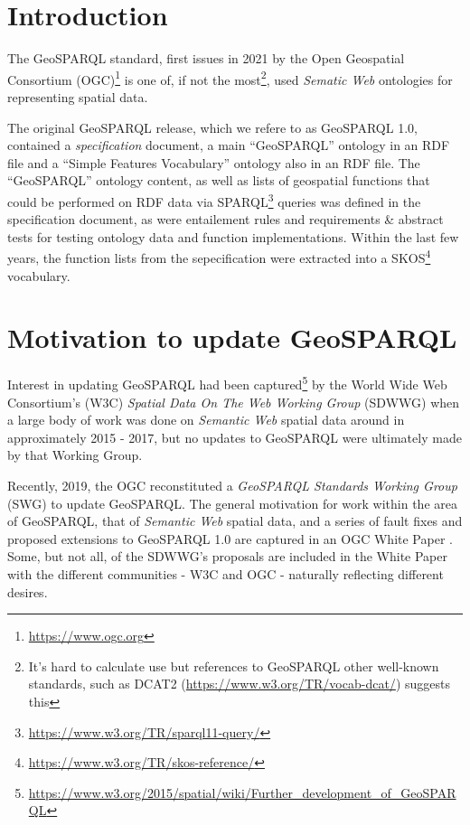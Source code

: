 \documentclass[runningheads]{llncs}
\begin{document}
\section{Introduction}\label{sec:introduction}
The GeoSPARQL standard, first issues in 2021 by the Open Geospatial Consortium (OGC)\footnote{\url{https://www.ogc.org}} 
is one of, if not the most\footnote{It's hard to calculate use but references to GeoSPARQL other well-known standards, 
such as DCAT2 (\url{https://www.w3.org/TR/vocab-dcat/}) suggests this}, used \textit{Sematic Web} ontologies for 
representing spatial data.

The original GeoSPARQL release, which we refere to as GeoSPARQL 1.0, contained a \textit{specification} document,
a main ``GeoSPARQL'' ontology in an RDF file and a ``Simple Features Vocabulary'' ontology also in an RDF file. The 
``GeoSPARQL'' ontology content, as well as lists of geospatial functions that could be performed on RDF data via 
SPARQL\footnote{\url{https://www.w3.org/TR/sparql11-query/}} queries was defined in the specification document, as
were entailement rules and requirements \& abstract tests for testing ontology data and function implementations. 
Within the last few years, the function lists from the sepecification were extracted into a SKOS\footnote{\url{https://www.w3.org/TR/skos-reference/}}
vocabulary.


\section{Motivation to update GeoSPARQL}\label{sec:motivation}
Interest in updating GeoSPARQL had been captured\footnote{\url{https://www.w3.org/2015/spatial/wiki/Further_development_of_GeoSPARQL}}
 by the World Wide Web Consortium's (W3C) \textit{Spatial Data On The Web Working Group} (SDWWG)
when a large body of work was done on \textit{Semantic Web} spatial data around in approximately 2015 - 2017, but 
no updates to GeoSPARQL were ultimately made by that Working Group.


Recently, 2019, the OGC reconstituted a \textit{GeoSPARQL Standards Working Group} (SWG) to update GeoSPARQL. The general 
motivation for work within the area of GeoSPARQL, that of \textit{Semantic Web} spatial data, and a series of
fault fixes and proposed extensions to GeoSPARQL 1.0 are captured in an OGC White Paper \cite{geosparqlwhitepaper}. Some,
but not all, of the SDWWG's proposals are included in the White Paper with the different communities - W3C and OGC - 
naturally reflecting different desires.
\end{document}
